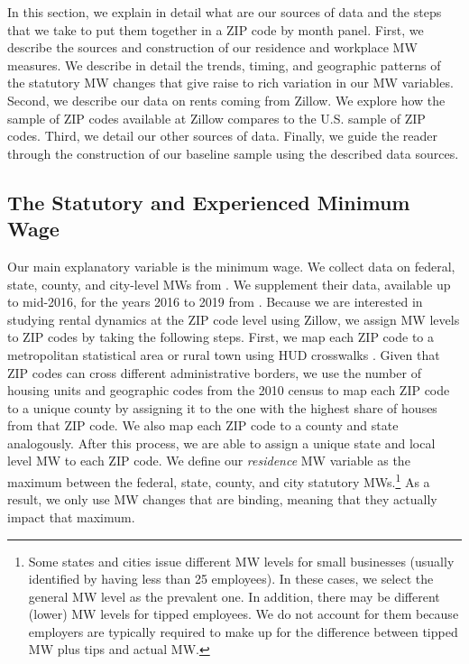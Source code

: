 
In this section, we explain in detail what are our sources of data and the steps that 
we take to put them together in a ZIP code by month panel. First, we describe the 
sources and construction of our residence and workplace MW measures. We describe in 
detail the trends, timing, and geographic patterns of the statutory MW changes that give 
raise to rich variation in our MW variables. Second, we describe our data on rents coming 
from Zillow. We explore how the sample of ZIP codes available at Zillow compares to the 
U.S. sample of ZIP codes. Third, we detail our other sources of data. Finally, we guide 
the reader through the construction of our baseline sample using the described data sources.

\subsection{The Statutory and Experienced Minimum Wage}\label{sec:mw_construction}

Our main explanatory variable is the minimum wage. We collect data on federal, state, 
county, and city-level MWs from \textcite{VaghulZipperer2016}. We supplement their data,
available up to mid-2016, for the years 2016 to 2019 from \textcite{BerkeleyLaborCenter}. 
Because we are interested in studying rental dynamics at the ZIP code level using Zillow, 
we assign MW levels to ZIP codes by taking the following steps. First, we map each ZIP code 
to a metropolitan statistical area or rural town using HUD crosswalks \parencite{hudCrosswalks}. 
Given that ZIP codes can cross different administrative borders, we use the number of housing 
units and geographic codes  from the 2010 census to map each ZIP code to a unique county by 
assigning it to the one with the highest share of houses from that ZIP code. We also map each 
ZIP code to a county and state analogously. After this process, we are able to assign a unique 
state and local level MW to each ZIP code. We define our \textit{residence} MW variable as 
the maximum between the federal, state, county, and city statutory MWs.\footnote{Some states 
	and cities issue different MW levels for small businesses (usually identified by having 
	less than 25 employees). In these cases, we select the general MW level as the prevalent 
	one. In addition, there may be different (lower) MW levels for tipped employees. We do not 
	account for them because employers are typically required to make up for the difference 
	between tipped MW plus tips and actual MW.}
As a result, we only use MW changes that are binding, meaning that they actually impact 
that maximum.

